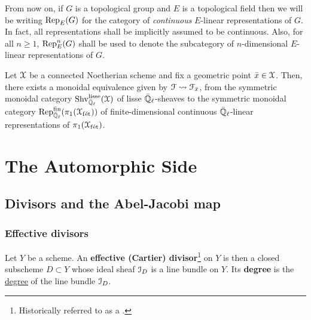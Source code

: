                 \begin{convention} \label{conv: continuous_linear_representations}
                    From now on, if $G$ is a topological group and $E$ is a topological field then we will be writing $\mathrm{Rep}_E(G)$ for the category of \textit{continuous} $E$-linear representations of $G$. In fact, all representations shall be implicitly assumed to be continuous. Also, for all $n \geq 1$, $\mathrm{Rep}_E^n(G)$ shall be used to denote the subcategory of $n$-dimensional $E$-linear representations of $G$.
                \end{convention}
                \begin{theorem} \label{theorem: galois_representations_are_lisse_sheaves}
                    \cite[Theorem 1.4.5.7]{conrad_etale_cohomology} Let $\mathcal{X}$ be a connected Noetherian scheme and fix a geometric point $\bar{x} \in \mathcal{X}$. Then, there exists a monoidal equivalence given by $\mathcal{F} \leadsto \mathcal{F}_{\bar{x}}$, from the symmetric monoidal category $\mathrm{Shv}_{\bar{\mathbb{Q}}_{\ell}}^{\mathrm{lisse}}(\mathcal{X})$ of lisse $\bar{\mathbb{Q}}_{\ell}$-sheaves to the symmetric monoidal category $\mathrm{Rep}_{\bar{\mathbb{Q}}_{\ell}}^{\mathrm{fin}}(\pi_1(\mathcal{X}_{\mathrm{f\acute{e}t}}))$ of finite-dimensional continuous $\bar{\mathbb{Q}}_{\ell}$-linear representations of $\pi_1(\mathcal{X}_{\mathrm{f\acute{e}t}})$.
                \end{theorem}

    \section{The Automorphic Side}
        \subsection{Divisors and the Abel-Jacobi map}
            \subsubsection{Effective divisors}
                \begin{definition}[Divisors] \label{def: divisors}
                    Let $Y$ be a scheme. An \textbf{effective (Cartier) divisor}\footnote{Historically referred to as a .} on $Y$ is then a closed subscheme $D \subset Y$ whose ideal sheaf $\mathcal{I}_D$ is a line bundle on $Y$. Its \textbf{degree} is the \href{https://stacks.math.columbia.edu/tag/0AYQ}{\underline{degree}} of the line bundle $\mathcal{I}_D$.  
                \end{definition}
                
